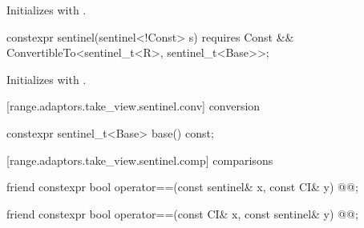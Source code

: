{\begin{itemdescr}
\pnum
\effects Initializes  with .
\end{itemdescr}

%
\begin{itemdecl}
constexpr sentinel(sentinel<!Const> s)
  requires Const && ConvertibleTo<sentinel_t<R>, sentinel_t<Base>>;
\end{itemdecl}

\begin{itemdescr}
\pnum
\effects Initializes  with .
\end{itemdescr}

[range.adaptors.take_view.sentinel.conv]{ conversion}

\begin{itemdecl}
constexpr sentinel_t<Base> base() const;
\end{itemdecl}

\begin{itemdescr}
\pnum
\oldtxt{\returns}  
\end{itemdescr}

[range.adaptors.take_view.sentinel.comp]{ comparisons}

\begin{itemdecl}
friend constexpr bool operator==(const sentinel& x, const CI& y)
  @@;
\end{itemdecl}

\begin{itemdescr}
\pnum
\oldtxt{\returns} 
\end{itemdescr}

\begin{itemdecl}
friend constexpr bool operator==(const CI& x, const sentinel& y)
  @@;
\end{itemdecl}

\begin{itemdescr}
\pnum
\oldtxt{\returns} 
\end{itemdescr}

}

